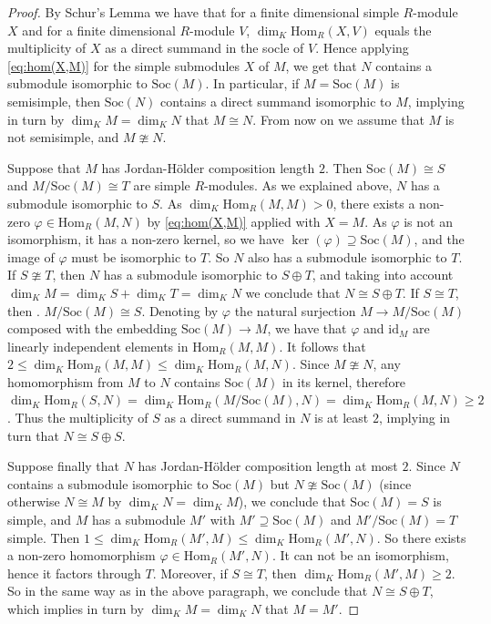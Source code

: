 \documentclass[12pt]{amsart}
\newcommand{\field}{K}
\renewcommand{\hom}{\mathrm{Hom}}
\begin{document}
\begin{proof}
By Schur's Lemma we have that for a finite dimensional simple $R$-module $X$ and 
for a finite dimensional $R$-module $V$, $\dim_{\field}\hom_{R}(X, V)$ equals 
the multiplicity of $X$ as a direct summand in the socle of $V$. 
Hence applying \eqref{eq:hom(X,M)} for the simple submodules $X$ of $M$, 
we get that $N$ contains a submodule isomorphic to $\mathrm{Soc}(M)$. 
In particular, if $M=\mathrm{Soc}(M)$ is semisimple, then $\mathrm{Soc}(N)$ 
contains a direct summand isomorphic to $M$, implying in turn 
by $\dim_{\field}M=\dim_{\field}N$  that $M\cong N$. 
From now on we assume that $M$ is not semisimple, 
and $M\ncong N$. 

Suppose that $M$ has Jordan-Hölder composition length $2$. 
Then $\mathrm{Soc}(M)\cong S$ and 
$M/\mathrm{Soc}(M)\cong T$ are simple $R$-modules. 
As we explained above, $N$ has a submodule isomorphic to $S$. 
As $\dim_{\field}\hom_R(M,M)>0$, there exists a non-zero 
$\varphi\in \hom_R(M,N)$ by \eqref{eq:hom(X,M)} applied with $X=M$. 
As $\varphi$ is not an isomorphism,  
it has a non-zero kernel, so we have $\ker(\varphi)\supseteq \mathrm{Soc}(M)$, 
and the image of $\varphi$ must be isomorphic to $T$. So $N$ also has a submodule 
isomorphic to $T$. 
If $S\ncong T$, then $N$ has a submodule isomorphic to $S\oplus T$, 
and taking into account 
$\dim_{\field}M=\dim_{\field}S+\dim_{\field}T=\dim_{\field}N$  
we conclude that $N\cong S\oplus T$. 
If $S\cong T$, then . 
$M/\mathrm{Soc}(M)\cong S$.  
Denoting by $\varphi$ 
the natural surjection $M\to M/\mathrm{Soc}(M)$ composed with the 
embedding $\mathrm{Soc}(M)\to M$, we have that $\varphi$ and 
$\mathrm{id}_M$ are linearly independent elements in 
$\hom_R(M,M)$. It follows that 
$2\le \dim_{\field}\hom_R(M,M)\le 
\dim_{\field}\hom_R(M,N)$. 
Since $M\ncong N$, any homomorphism from $M$ to $N$ contains 
$\mathrm{Soc}(M)$ in its kernel, therefore 
$\dim_{\field}\hom_R(S,N)=\dim_{\field}\hom_R(M/\mathrm{Soc}(M),N)=
\dim_{\field}\hom_R(M,N)\ge 2$. 
Thus the multiplicity of $S$ as a direct summand in $N$ is at least $2$, 
implying in turn that $N\cong S\oplus S$. 

Suppose finally that $N$ has Jordan-Hölder composition length at most $2$. 
Since $N$ contains a submodule isomorphic to 
$\mathrm{Soc}(M)$ but 
$N\ncong \mathrm{Soc}(M)$ 
(since otherwise $N\cong M$ by $\dim_\field N=\dim_\field M$), 
we conclude that $\mathrm{Soc}(M)=S$ is simple, and $M$ has a submodule $M'$ 
with $M'\supseteq \mathrm{Soc}(M)$ and $M'/\mathrm{Soc}(M)=T$ simple. 
Then $1\le \dim_\field\hom_R(M',M)\le \dim_\field\hom_R(M',N)$. 
So there exists a non-zero homomorphism $\varphi\in \hom_R(M',N)$. 
It can not be an isomorphism, hence it factors through $T$. 
Moreover, if $S\cong T$, then $\dim_\field\hom_R(M',M)\ge 2$. 
So in the same way as in the above paragraph, we conclude that $N\cong S\oplus T$, which implies 
in turn by $\dim_\field M=\dim_\field N$ 
that $M=M'$. 
\end{proof}
\end{document}
